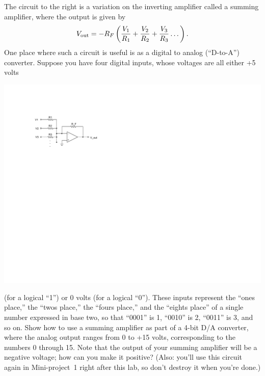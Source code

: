 \begin{enumerate}[wide]
\begin{minipage}{.50\textwidth}
\item The circuit to the right is a variation on the inverting amplifier called a summing amplifier, where the output is given by \label{part_summer}
\begin{equation*}
V_{\rm out} = -R_F \left( \frac{V_1}{R_1} + \frac{V_2}{R_2} +\frac{V_3}{R_3} \dots \right).
\end{equation*}
\startsquarepar 
One place where such a circuit is useful is as a digital to analog (``D-to-A'') converter.  Suppose you have four  
digital inputs, whose voltages are all either +5 volts
\stopsquarepar
\end{minipage}
\begin{minipage}{.49\textwidth}
\begin{flushright}
\includegraphics{op-amps/summing_amp.pdf}
\end{flushright}
\end{minipage}

(for a logical ``1'') or 0 volts (for a logical ``0'').  These inputs represent the ``ones place,'' the ``twos place,'' the ``fours place,'' and the ``eights place'' of a single number expressed in base two, so that ``0001'' is 1, ``0010'' is 2, ``0011'' is 3, and so on.  Show how to use a summing amplifier as part of a 4-bit D/A converter, where the analog output ranges from 0 to +15 volts, corresponding to the numbers 0 through 15.  Note that the output of your summing amplifier will be a negative voltage; how can you make it positive?  (Also: you'll use this circuit again in Mini-project~1 right after this lab, so don't destroy it when you're done.) 


\end{enumerate}
